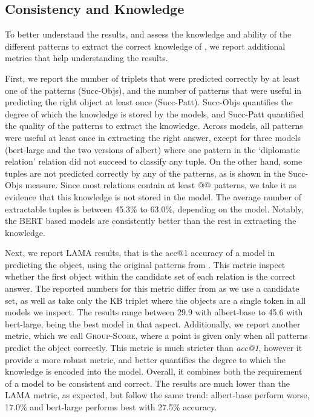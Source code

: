 % 


\subsection{Consistency and Knowledge}

To better understand the results, and assess the knowledge and ability of the different patterns to extract the correct knowledge of \resource{}, we report additional metrics that help understanding the results.

First, we report the number of triplets that were predicted correctly by at least one of the patterns (Succ-Objs), and the number of patterns that were useful in predicting the right object at least once (Succ-Patt). Succ-Objs quantifies the degree of which the knowledge is stored by the models, and Succ-Patt quantified the quality of the patterns to extract the knowledge.
Across models, all patterns were useful at least once in extracting the right answer, except for three models (bert-large and the two versions of albert) where one pattern in the `diplomatic relation' relation did not succeed to classify any tuple.
On the other hand, some tuples are not predicted correctly by any of the patterns, as is shown in the Succ-Objs measure. Since most relations contain at least @@ patterns, we take it as evidence that this knowledge is not stored in the model. 
The average number of extractable tuples is between 45.3\% to 63.0\%, depending on the model. Notably, the BERT based models are consistently better than the rest in extracting the knowledge. 

Next, we report LAMA results, that is the acc@1 accuracy of a model in predicting the object, using the original patterns from \citet{lama}. This metric inspect whether the first object within the candidate set of each relation is the correct answer. The reported numbers for this metric differ from \citet{lama} as we use a candidate set, as well as take only the KB triplet where the objects are a single token in all models we inspect. The results range between 29.9 with albert-base to 45.6 with bert-large, being the best model in that aspect.
Additionally, we report another metric, which we call \textsc{Group-Score}, where a point is given only when all patterns predict the object correctly. This metric is much stricter than \textit{acc@1}, however it provide a more robust metric, and better quantifies the degree to which the knowledge is encoded into the model. Overall, it combines both the requirement of a model to be consistent and correct. The results are much lower than the LAMA metric, as expected, but follow the same trend: albert-base perform worse, 17.0\% and bert-large performs best with 27.5\% accuracy.

